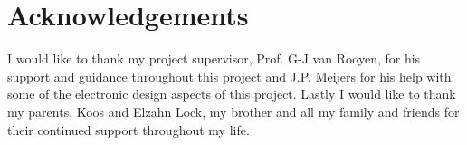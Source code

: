 \chapter{Acknowledgements}

I would like to thank my project supervisor, Prof. G-J van Rooyen, for his
support and guidance throughout this project and J.P. Meijers for his help with
some of the electronic design aspects of this project.
\newline
\newline
Lastly I would like to thank my parents, Koos and Elzahn Lock, my brother and
all my family and friends for their continued support throughout my life. 



